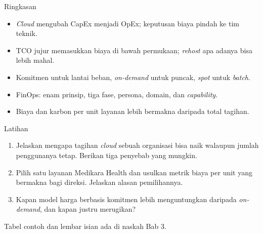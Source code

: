\documentclass[aspectratio=169, table, 12pt]{beamer}
\begin{document}
\begin{frame}{{\Large Ringkasan}}
  \vspace{10pt}
  \begin{itemize}
    \item \textit{Cloud} mengubah CapEx menjadi OpEx; keputusan biaya pindah ke
          tim teknik.
    \item TCO jujur memasukkan biaya di bawah permukaan; \textit{rehost} apa
          adanya bisa lebih mahal.
    \item Komitmen untuk lantai beban, \textit{on-demand} untuk puncak,
          \textit{spot} untuk \textit{batch}.
    \item FinOps: enam prinsip, tiga fase, persona, domain, dan
          \textit{capability}.
    \item Biaya dan karbon per unit layanan lebih bermakna daripada total
          tagihan.
  \end{itemize}
\end{frame}

\begin{frame}{{\Large Latihan}}
  \vspace{10pt}
  \begin{enumerate}
    \item Jelaskan mengapa tagihan \textit{cloud} sebuah organisasi bisa naik
          walaupun jumlah penggunanya tetap. Berikan tiga penyebab yang mungkin.
    \item Pilih satu layanan Medikara Health dan usulkan metrik biaya per unit
          yang bermakna bagi direksi. Jelaskan alasan pemilihannya.
    \item Kapan model harga berbasis komitmen lebih menguntungkan daripada
          \textit{on-demand}, dan kapan justru merugikan?
  \end{enumerate}
  \vspace{6pt}
  {\small Tabel contoh dan lembar isian ada di naskah Bab 3.}
\end{frame}
\end{document}
